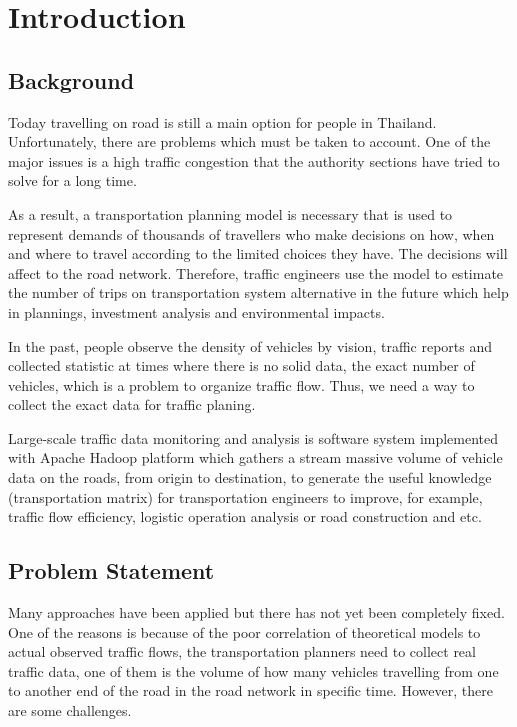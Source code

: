 \setlength{\footskip}{8mm}
\mainmatter
\chapter{Introduction}

\section{Background}
\cite[p. 2]{yamato92hmm} Today travelling on road is still a main option for people in Thailand. Unfortunately, there are problems which must be taken to account. One of the major issues is a high traffic congestion that the authority sections have tried to solve for a long time.

As a result, a transportation planning model is necessary that is used to represent demands of thousands of travellers who make decisions on how, when and where to travel according to the limited choices they have. The decisions will affect to the road network. Therefore, traffic engineers use the model to estimate the number of trips on transportation system alternative in the future which help in plannings, investment analysis and environmental impacts.

In the past, people observe the density of vehicles by vision, traffic reports and collected statistic at times where there is no solid data, the exact number of vehicles, which is a problem to organize traffic flow. Thus, we need a way to collect the exact data for traffic planing.

Large-scale traffic data monitoring and analysis is software system implemented with Apache Hadoop platform which gathers a stream massive volume of vehicle data on the roads, from origin to destination, to generate the useful knowledge (transportation matrix) for transportation engineers to improve, for example, traffic flow efficiency, logistic operation analysis or road construction and etc.

\nocite{web:transportation_model}

\section{Problem Statement}

Many approaches have been applied but there has not yet been completely fixed. One of the reasons is because of the poor correlation of theoretical models to actual observed traffic flows, the transportation planners need to collect real traffic data, one of them is the volume of how many vehicles travelling from one to another end of the road in the road network in specific time. However, there are some challenges.

